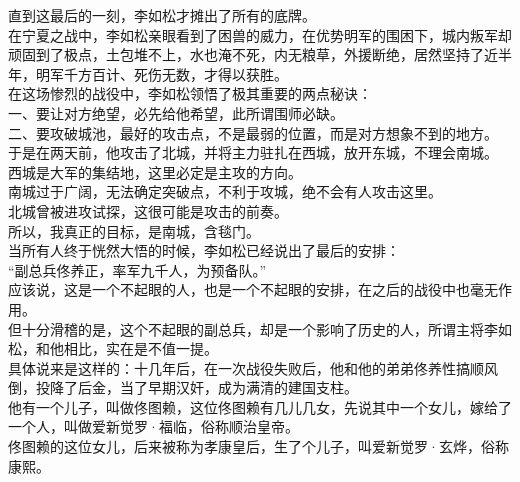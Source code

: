 \begin{multicols}{\theparacolNo}
直到这最后的一刻，李如松才摊出了所有的底牌。\\

在宁夏之战中，李如松亲眼看到了困兽的威力，在优势明军的围困下，城内叛军却顽固到了极点，土包堆不上，水也淹不死，内无粮草，外援断绝，居然坚持了近半年，明军千方百计、死伤无数，才得以获胜。\\

在这场惨烈的战役中，李如松领悟了极其重要的两点秘诀：\\

一、要让对方绝望，必先给他希望，此所谓围师必缺。\\

二、要攻破城池，最好的攻击点，不是最弱的位置，而是对方想象不到的地方。\\

于是在两天前，他攻击了北城，并将主力驻扎在西城，放开东城，不理会南城。\\

西城是大军的集结地，这里必定是主攻的方向。\\

南城过于广阔，无法确定突破点，不利于攻城，绝不会有人攻击这里。\\

北城曾被进攻试探，这很可能是攻击的前奏。\\

所以，我真正的目标，是南城，含毯门。\\

当所有人终于恍然大悟的时候，李如松已经说出了最后的安排：\\

“副总兵佟养正，率军九千人，为预备队。”\\

应该说，这是一个不起眼的人，也是一个不起眼的安排，在之后的战役中也毫无作用。\\

但十分滑稽的是，这个不起眼的副总兵，却是一个影响了历史的人，所谓主将李如松，和他相比，实在是不值一提。\\

具体说来是这样的：十几年后，在一次战役失败后，他和他的弟弟佟养性搞顺风倒，投降了后金，当了早期汉奸，成为满清的建国支柱。\\

他有一个儿子，叫做佟图赖，这位佟图赖有几儿几女，先说其中一个女儿，嫁给了一个人，叫做爱新觉罗·福临，俗称顺治皇帝。\\

佟图赖的这位女儿，后来被称为孝康皇后，生了个儿子，叫爱新觉罗·玄烨，俗称康熙。\\


\end{multicols}
